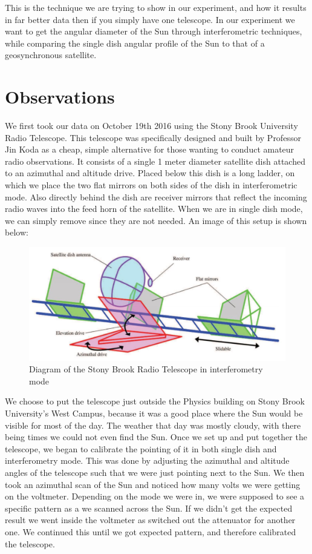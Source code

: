 \documentclass{aastex61}
\begin{document}
This is the technique we are trying to show in our experiment, and how it results in far better data then if you simply have one telescope. In our experiment we want to get the angular diameter of the Sun through interferometric techniques, while comparing the single dish angular profile of the Sun to that of a geosynchronous satellite. 

\section{Observations}
We first took our data on October 19th 2016 using the Stony Brook University Radio Telescope. This telescope was specifically designed and built by Professor Jin Koda as a cheap, simple alternative for those wanting to conduct amateur radio observations. It consists of a single 1 meter diameter satellite dish attached to an azimuthal and altitude drive. Placed below this dish is a long ladder, on which we place the two flat mirrors on both sides of the dish in interferometric mode. Also directly behind the dish are receiver mirrors that reflect the incoming radio waves into the feed horn of the satellite. When we are in single dish mode, we can simply remove since they are not needed. An image of this setup is shown below:
\begin{figure}[hbt!]
	\centering
	\includegraphics[scale = .45]{tourels.jpg}
	\caption{Diagram of the Stony Brook Radio Telescope in interferometry mode \cite{2016AmJPh..84..249K}}
	\label{fig: refcurve1}
\end{figure}

We choose to put the telescope just outside the Physics building on Stony Brook University's West Campus, because it was a good place where the Sun would be visible for most of the day. The weather that day was mostly cloudy, with there being times we could not even find the Sun. Once we set up and put together the telescope, we began to calibrate the pointing of it in both single dish and interferometry mode. This was done by adjusting the azimuthal and altitude angles of the telescope such that we were just pointing next to the Sun. We then took an azimuthal scan of the Sun and noticed how many volts we were getting on the voltmeter. Depending on the mode we were in, we were supposed to see a specific pattern as a we scanned across the Sun. If we didn't get the expected result we went inside the voltmeter as switched out the attenuator for another one. We continued this until we got expected pattern, and therefore calibrated the telescope. 
\end{document}

